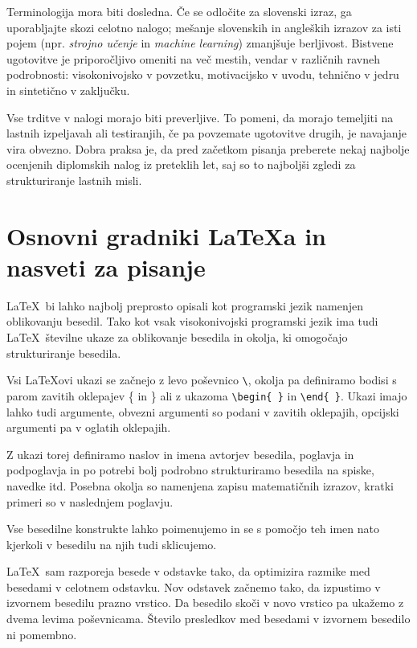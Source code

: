 \documentclass[a4paper,12pt,openright]{book}
\begin{document}
Terminologija mora biti dosledna. Če se odločite za slovenski izraz, ga uporabljajte skozi celotno nalogo; mešanje slovenskih in angleških izrazov za isti pojem (npr. \textit{strojno učenje} in \textit{machine learning}) zmanjšuje berljivost. Bistvene ugotovitve je priporočljivo omeniti na več mestih, vendar v različnih ravneh podrobnosti: visokonivojsko v povzetku, motivacijsko v uvodu, tehnično v jedru in sintetično v zaključku.

Vse trditve v nalogi morajo biti preverljive. To pomeni, da morajo temeljiti na lastnih izpeljavah ali testiranjih, če pa povzemate ugotovitve drugih, je navajanje vira obvezno. Dobra praksa je, da pred začetkom pisanja preberete nekaj najbolje ocenjenih diplomskih nalog iz preteklih let, saj so to najboljši zgledi za strukturiranje lastnih misli.

\chapter{Osnovni gradniki \LaTeX{a} in nasveti za pisanje}
\label{ch:osnove}

\LaTeX\ bi lahko najbolj preprosto opisali kot programski jezik namenjen oblikovanju besedil.
Tako kot vsak visokonivojski programski jezik ima tudi \LaTeX\  številne ukaze za oblikovanje  besedila in okolja, ki omogočajo strukturiranje besedila.

Vsi \LaTeX ovi ukazi se začnejo z levo poševnico \texttt{\textbackslash}, okolja pa definiramo bodisi s parom zavitih oklepajev \{ in \} ali z ukazoma \texttt{\textbackslash begin\{ \}} in \texttt{\textbackslash end\{ \}}.
Ukazi imajo lahko tudi argumente, obvezni argumenti so podani v zavitih oklepajih, opcijski argumenti pa v oglatih oklepajih.

Z ukazi torej definiramo naslov in imena avtorjev besedila, poglavja in podpoglavja in po potrebi bolj podrobno strukturiramo besedila na spiske, navedke itd.
Posebna okolja so namenjena zapisu matematičnih izrazov, kratki primeri so v naslednjem poglavju.

Vse besedilne konstrukte lahko poimenujemo in se s pomočjo teh imen nato  kjerkoli v besedilu na njih  tudi sklicujemo.

\LaTeX\ sam razporeja besede v odstavke tako, da optimizira razmike med besedami v celotnem odstavku.
Nov odstavek začnemo tako, da izpustimo v izvornem besedilu prazno vrstico. Da besedilo skoči v novo vrstico pa ukažemo z dvema levima poševnicama.
Število presledkov med besedami v izvornem besedilo ni pomembno.
\end{document}
